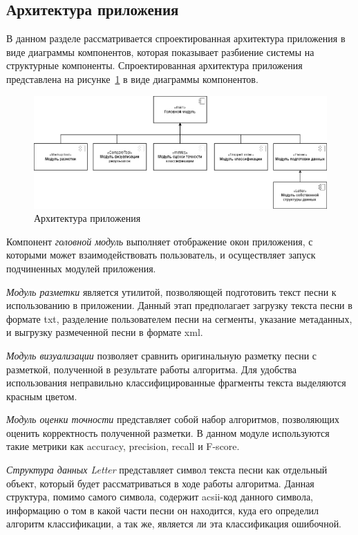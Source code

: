 \vspace{2em}
\subsection{Архитектура приложения}
В данном разделе рассматривается спроектированная архитектура
приложения в виде диаграммы компонентов, которая показывает разбиение
системы на структурные компоненты. Спроектированная архитектура приложения представлена на рисунке~\ref{fig:Структура}  в виде диаграммы компонентов.

\begin{figure}[h]
    \centering
    \includegraphics[width=1\linewidth]{pictures/Структура.png}
    \caption{Архитектура приложения}
    \label{fig:Структура}
\end{figure}

Компонент \textit{головной модуль} выполняет отображение окон приложения, с которыми может взаимодействовать пользователь, и осуществляет запуск подчиненных модулей приложения.

\textit{Модуль разметки} является утилитой, позволяющей подготовить текст песни к использованию в приложении. Данный этап предполагает загрузку текста песни в формате txt, разделение пользователем песни на сегменты, указание метаданных, и выгрузку размеченной песни в формате xml.

\textit{Модуль визуализации} позволяет сравнить оригинальную разметку песни с разметкой, полученной в результате работы алгоритма. Для удобства использования неправильно классифицированные фрагменты текста выделяются красным цветом.

\textit{Модуль оценки точности} представляет собой набор алгоритмов, позволяющих оценить корректность полученной разметки. В данном модуле используются такие метрики как accuracy, precision, recall и F-score.  

\textit{Структура данных Letter} представляет символ текста песни как отдельный объект, который будет рассматриваться в ходе работы алгоритма. Данная структура, помимо самого символа, содержит acsii-код данного символа, информацию о том в какой части песни он находится, куда его определил алгоритм классификации, а так же, является ли эта классификация ошибочной. 

